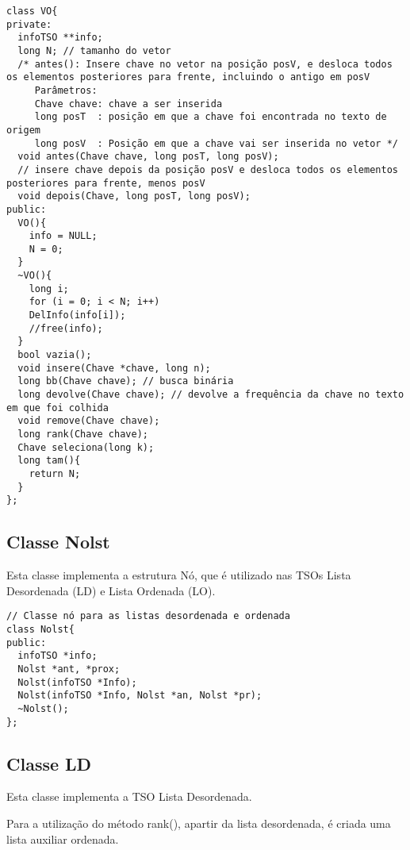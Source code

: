 \documentclass[a4paper]{article}
\begin{document}
\begin{verbatim}
class VO{
private:
  infoTSO **info;
  long N; // tamanho do vetor
  /* antes(): Insere chave no vetor na posição posV, e desloca todos os elementos posteriores para frente, incluindo o antigo em posV
     Parâmetros:
     Chave chave: chave a ser inserida
     long posT  : posição em que a chave foi encontrada no texto de origem
     long posV  : Posição em que a chave vai ser inserida no vetor */
  void antes(Chave chave, long posT, long posV);
  // insere chave depois da posição posV e desloca todos os elementos posteriores para frente, menos posV
  void depois(Chave, long posT, long posV);
public:
  VO(){
    info = NULL;
    N = 0;
  }
  ~VO(){
    long i;
    for (i = 0; i < N; i++)
    DelInfo(info[i]);
    //free(info);
  }
  bool vazia();
  void insere(Chave *chave, long n);
  long bb(Chave chave); // busca binária
  long devolve(Chave chave); // devolve a frequência da chave no texto em que foi colhida
  void remove(Chave chave);
  long rank(Chave chave);
  Chave seleciona(long k);
  long tam(){
    return N;
  }
};
\end{verbatim}


\subsection{Classe Nolst}
\label{sec:classe-nolst}

Esta classe implementa a estrutura Nó, que é utilizado nas TSOs Lista Desordenada (LD) e Lista Ordenada (LO).

\begin{verbatim}
// Classe nó para as listas desordenada e ordenada
class Nolst{
public:
  infoTSO *info;
  Nolst *ant, *prox;
  Nolst(infoTSO *Info);
  Nolst(infoTSO *Info, Nolst *an, Nolst *pr);
  ~Nolst();
};
\end{verbatim}

\subsection{Classe LD}
\label{sec:classe-ld}

Esta classe implementa a TSO Lista Desordenada.

Para a utilização do método rank(), apartir da lista desordenada, é criada uma lista auxiliar ordenada.
\end{document}
